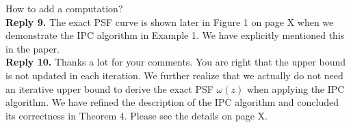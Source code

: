 \documentclass[11pt]{article}
\begin{document}
How to add a computation?
\\[4mm]
%
%

\noindent \textbf{Reply 9.}
The exact PSF curve is shown later in Figure 1 on page X when we demonstrate the IPC algorithm in Example 1. We have explicitly mentioned this in the paper.
\\[4mm]
%
%

\noindent \textbf{Reply 10.}
Thanks a lot for your comments.
You are right that the upper bound is not updated in each iteration. We further realize that we actually do not need an iterative upper bound to derive the exact PSF $\omega(z)$ when applying the IPC algorithm.
We have refined the description of the IPC algorithm and concluded its correctness in Theorem 4.
Please see the details on page X.
\\[4mm]
%


\end{document}
